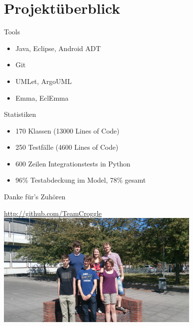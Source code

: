 \section{Projektüberblick}

\begin{frame}{Tools}
	\begin{itemize}
		\item Java, Eclipse, Android ADT
		\item Git
		\item UMLet, ArgoUML
		\item Emma, EclEmma
	\end{itemize}
\end{frame}

\begin{frame}{Statistiken}
	\begin{itemize}
		\item 170 Klassen (13000 Lines of Code)
		\item 250 Testfälle (4600 Lines of Code)
		\item 600 Zeilen Integrationstests in Python
		\item 96\% Testabdeckung im Model, 78\% gesamt
	\end{itemize}
\end{frame}

\begin{frame}{Danke für's Zuhören}
	\begin{center}
		\textcolor{blue}{\href{http://github.com/TeamCroggle}{http://github.com/TeamCroggle}}
		\includegraphics[width=10cm,type=jpg,ext=.jpg,read=.jpg]{media/2014-06-24 10.56.29}
	\end{center}
\end{frame}
